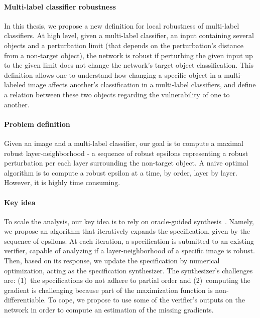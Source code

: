 \paragraph{Multi-label classifier robustness}
In this thesis, we propose a new definition for local robustness of multi-label classifiers.
At high level, given a multi-label classifier, an input containing several objects and a perturbation limit (that depends on the perturbation's distance from a non-target object), the network is robust if perturbing the given input up to the given limit does not change the network's target object classification.
This definition allows one to understand how changing a specific object in a multi-labeled image affects another's classification in a multi-label classifiers, and define a relation between these two objects regarding the vulnerability of one to another.

\paragraph{Problem definition} Given an image and a multi-label classifier, our goal is to compute a maximal robust layer-neighborhood - a sequence of robust epsilons representing a robust perturbation per each layer surrounding the non-target object.
A naive optimal algorithm is to compute a robust epsilon at a time, by order, layer by layer.
However, it is highly time consuming.

\paragraph{Key idea} To scale the analysis, our key idea is to rely on oracle-guided synthesis~\cite{OracleGuided}.
Namely, we propose an algorithm that iteratively expands the specification, given by the sequence of epsilons.
At each iteration, a specification is submitted to an existing verifier, capable of analyzing if a layer-neighborhood of a specific image is robust.
Then, based on its response, we update the specification by numerical optimization, acting as the specification synthesizer.
The synthesizer's challenges are: (1)~the specifications do not adhere to partial order and (2)~computing the gradient is challenging because part of the maximization function is non-differentiable.
To cope, we propose to use some of the verifier's outputs on the network in order to compute an estimation of the missing gradients.

